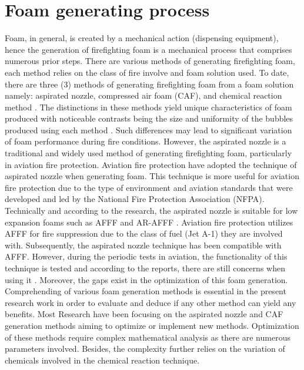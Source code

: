 \section{Foam generating process}
Foam, in general, is created by a mechanical action (dispensing equipment), hence the generation of firefighting foam is a mechanical process that comprises numerous prior steps. There are various methods of generating firefighting foam, each method relies on the class of fire involve and foam solution used. To date, there are three (3) methods of generating firefighting foam from a foam solution namely: aspirated nozzle, compressed air foam (CAF), and chemical reaction method \cite{laundess2012suppression}. The distinctions in these methods yield unique characteristics of foam produced with noticeable contrasts being the size and uniformity of the bubbles produced using each method \cite{laundess2012suppression}. Such differences may lead to significant variation of foam performance during fire conditions. However, the aspirated nozzle is a traditional and widely used method of generating firefighting foam, particularly in aviation fire protection.
Aviation fire protection have adopted the technique of aspirated nozzle when generating foam. This technique is more useful for aviation fire protection due to the type of environment and aviation standards that were developed and led by the National Fire Protection Association (NFPA). Technically and according to the research, the aspirated nozzle is suitable for low expansion foams such as AFFF and AR-AFFF \cite{xi2017experimental}.  Aviation fire protection utilizes AFFF for fire suppression due to the class of fuel (Jet A-1) they are involved with. Subsequently, the aspirated nozzle technique has been compatible with AFFF. However, during the periodic tests in aviation, the functionality of this technique is tested and according to the reports, there are still concerns when using it \cite{laundess2012suppression}. Moreover, the gaps exist in the optimization of this foam generation.
Comprehending of various foam generation methods is essential in the present research work in order to evaluate and deduce if any other method can yield any benefits. Most Research have been focusing on the aspirated nozzle and CAF generation methods aiming to optimize or implement new methods. Optimization of these methods require complex mathematical analysis as there are numerous parameters involved. Besides, the complexity further relies on the variation of chemicals involved in the chemical reaction technique.
